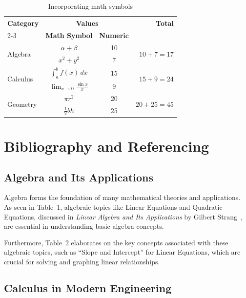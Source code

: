 \documentclass{article}
\begin{document}
\begin{enumerate}
\begin{table}[h]
\centering
\begin{tabular}{lccr}
\toprule
\multirow{2}{*}{\textbf{Category}} & \multicolumn{2}{c}{\textbf{Values}} & \multirow{2}{*}{\textbf{Total}} \\
\cmidrule(lr){2-3}
& \textbf{Math Symbol} & \textbf{Numeric} & \\
\midrule
\multirow{2}{*}{Algebra} & $\alpha + \beta$ & 10 & \multirow{2}{*}{$10 + 7 = 17$} \\
& $x^2 + y^2$ & 7 & \\
\midrule
\multirow{2}{*}{Calculus} & $\int_a^b f(x)\,dx$ & 15 & \multirow{2}{*}{$15 + 9 = 24$} \\
& $\lim_{x\to 0}\frac{\sin x}{x}$ & 9 & \\
\midrule
\multirow{2}{*}{Geometry} & $\pi r^2$ & 20 & \multirow{2}{*}{$20 + 25 = 45$} \\
& $\frac{1}{2}bh$ & 25 & \\
\bottomrule
\end{tabular}
\caption{Incorporating math symbols}
\label{tab:table3}
\end{table}

\end{enumerate}

\newpage
\section{Bibliography and Referencing}

\subsection{Algebra and Its Applications}

Algebra forms the foundation of many mathematical theories and applications. As seen in Table~1, algebraic topics like Linear Equations and Quadratic Equations, discussed in \textit{Linear Algebra and Its Applications} by Gilbert Strang~\cite{strang}, are essential in understanding basic algebra concepts. 

Furthermore, Table~2 elaborates on the key concepts associated with these algebraic topics, such as ``Slope and Intercept'' for Linear Equations, which are crucial for solving and graphing linear relationships.

\subsection{Calculus in Modern Engineering}
\end{document}
